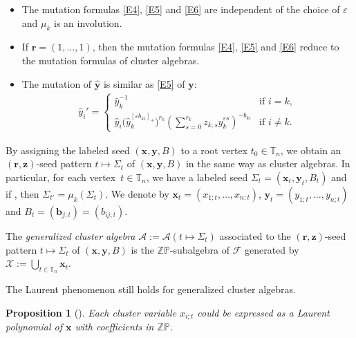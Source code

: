 \documentclass[11pt]{article}
\numberwithin{equation}{section}
\newcommand{\Z}{\mathbb{Z}}
\numberwithin{equation}{section}
\newtheorem{Proposition}[Theorem]{Proposition}
 { \theoremstyle{definition}
\newtheorem{Definition}[Theorem]{Definition}
\newtheorem{Note}[Theorem]{Note}
\newtheorem{Example}[Theorem]{Example}
\newtheorem{Remark}[Theorem]{Remark} }
\begin{document}
\begin{Remark}\label{R1}\quad
\begin{itemize}\itemsep=0pt
\item[(1)] The mutation formulas \eqref{E4}, \eqref{E5} and \eqref{E6} are independent of the choice of $\varepsilon$ and $\mu_k$ is an involution.
 \item[(2)] If $\mathbf{r}=(1,\dots,1)$, then the mutation formulas \eqref{E4}, \eqref{E5} and \eqref{E6} reduce to the mutation formulas of cluster algebras.
 \item[(3)] The mutation of $\hat{\mathbf{y}}$ is similar as \eqref{E5} of $\mathbf{y}$:
 \begin{align*}
 \hat{y}_i'=
 \begin{cases}
 \hat{y}_k^{-1} & \text{if $i= k$}, \\
 \displaystyle \hat{y}_i\bigl(\hat{y}_k^{[\varepsilon b_{ki}]_+}\bigr)^{r_k}\left(\sum\limits_{s=0}^{r_k}z_{k,s}\hat{y}_k^{\varepsilon s}\right)^{-b_{ki}}& \text{if $i\neq k$}.
 \end{cases}
 \end{align*}
\end{itemize}
\end{Remark}

By assigning the labeled seed $(\mathbf{x},\mathbf{y}, B)$ to a root vertex $t_0\in \mathbb{T}_n$, we obtain an $(\mathbf{r},\mathbf{z})$-seed pattern $t\mapsto \Sigma_t$ of $(\mathbf{x},\mathbf{y}, B)$ in the same way as cluster algebras. In particular, for each vertex~${t\in \mathbb{T}_n}$, we have a labeled seed $\Sigma_t=(\mathbf{x}_t, \mathbf{y}_t, B_t)$ and if , then $\Sigma_{t'}=\mu_k(\Sigma_t)$. We denote by $\mathbf{x}_t=(x_{1;t},\dots, x_{n;t})$, $\mathbf{y}_t=(y_{1;t},\dots,y_{n;t})$ and $B_t=(\mathbf{b}_{j;t})=(b_{ij;t})$.
\begin{Definition}
 The {\it generalized cluster algebra} $\mathcal{A}:=\mathcal{A}(t\mapsto \Sigma_t)$ associated to the $(\mathbf{r},\mathbf{z})$-seed pattern $t\mapsto \Sigma_t$ of $(\mathbf{x},\mathbf{y}, B)$ is the $\Z \mathbb{P}$-subalgebra of $\mathcal{F}$ generated by
 $\mathcal{X}:=\bigcup_{t\in \mathbb{T}_n}\mathbf{x}_t$.
\end{Definition}
The Laurent phenomenon still holds for generalized cluster algebras.
\begin{Proposition}[{\cite[Theorem 2.5]{Chekhov_Shapiro}}]\label{P6}
 Each cluster variable $x_{i;t}$ could be expressed as a Laurent polynomial of $\mathbf{x}$ with coefficients in $\mathbb{Z}\mathbb{P}$.
\end{Proposition}
\end{document}
